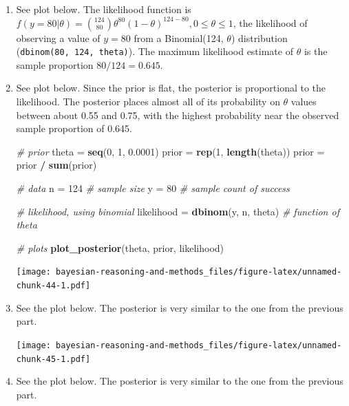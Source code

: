 \documentclass[
]{book}
\newenvironment{Shaded}{\begin{snugshade}}{\end{snugshade}}
\newcommand{\CommentTok}[1]{\textcolor[rgb]{0.56,0.35,0.01}{\textit{#1}}}
\newcommand{\DecValTok}[1]{\textcolor[rgb]{0.00,0.00,0.81}{#1}}
\newcommand{\FloatTok}[1]{\textcolor[rgb]{0.00,0.00,0.81}{#1}}
\newcommand{\KeywordTok}[1]{\textcolor[rgb]{0.13,0.29,0.53}{\textbf{#1}}}
\newcommand{\NormalTok}[1]{#1}
\newcommand{\OperatorTok}[1]{\textcolor[rgb]{0.81,0.36,0.00}{\textbf{#1}}}
\newcommand{\StringTok}[1]{\textcolor[rgb]{0.31,0.60,0.02}{#1}}
\theoremstyle{definition}
\theoremstyle{definition}
\theoremstyle{definition}
\theoremstyle{remark}
\begin{document}
\begin{enumerate}
\def\labelenumi{\arabic{enumi}.}
\item
  See plot below. The likelihood function is \(f(y=80|\theta) = \binom{124}{80}\theta^{80}(1-\theta)^{124-80}, 0 \le\theta\le1\), the likelihood of observing a value of \(y=80\) from a Binomial(124, \(\theta\)) distribution (\texttt{dbinom(80,\ 124,\ theta)}). The maximum likelihood estimate of \(\theta\) is the sample proportion \(80/124=0.645\).
\item
  See plot below. Since the prior is flat, the posterior is proportional to the likelihood. The posterior places almost all of its probability on \(\theta\) values between about 0.55 and 0.75, with the highest probability near the observed sample proportion of 0.645.

\begin{Shaded}
\begin{Highlighting}[]
\CommentTok{\# prior}
\NormalTok{theta =}\StringTok{ }\KeywordTok{seq}\NormalTok{(}\DecValTok{0}\NormalTok{, }\DecValTok{1}\NormalTok{, }\FloatTok{0.0001}\NormalTok{)}
\NormalTok{prior =}\StringTok{ }\KeywordTok{rep}\NormalTok{(}\DecValTok{1}\NormalTok{, }\KeywordTok{length}\NormalTok{(theta))}
\NormalTok{prior =}\StringTok{ }\NormalTok{prior }\OperatorTok{/}\StringTok{ }\KeywordTok{sum}\NormalTok{(prior)}

\CommentTok{\# data}
\NormalTok{n =}\StringTok{ }\DecValTok{124} \CommentTok{\# sample size}
\NormalTok{y =}\StringTok{ }\DecValTok{80} \CommentTok{\# sample count of success}

\CommentTok{\# likelihood, using binomial}
\NormalTok{likelihood =}\StringTok{ }\KeywordTok{dbinom}\NormalTok{(y, n, theta) }\CommentTok{\# function of theta}

\CommentTok{\# plots}
\KeywordTok{plot\_posterior}\NormalTok{(theta, prior, likelihood)}
\end{Highlighting}
\end{Shaded}

  \texttt{[image: bayesian-reasoning-and-methods\_files/figure-latex/unnamed-chunk-44-1.pdf]}
\item
  See the plot below. The posterior is very similar to the one from the previous part.

  \texttt{[image: bayesian-reasoning-and-methods\_files/figure-latex/unnamed-chunk-45-1.pdf]}
\item
  See the plot below. The posterior is very similar to the one from the previous part.


\end{enumerate}
\end{document}
